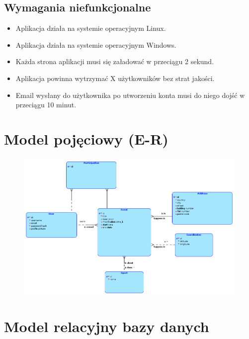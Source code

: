 \documentclass[11pt,a4paper]{article}
\begin{document}
\subsection{Wymagania niefunkcjonalne}

\begin{itemize}
    \item Aplikacja działa na systemie operacyjnym Linux.
    \item Aplikacja działa na systemie operacyjnym Windows.
    \item Każda strona aplikacji musi się załadować w przeciągu 2 sekund.
    \item Aplikacja powinna wytrzymać X użytkowników bez strat jakości.
    \item Email wysłany do użytkownika po utworzeniu konta musi do niego dojść w przeciągu 10 minut.
\end{itemize}

\section{Model pojęciowy (E-R)}

\begin{figure} [H]
    \centering
    \includegraphics[width=0.95\linewidth]{model/model_er.png}
\end{figure}

\section{Model relacyjny bazy danych}
\end{document}
